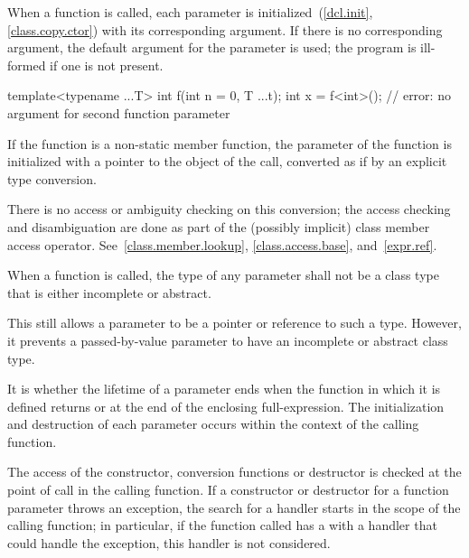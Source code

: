 \pnum
{}%
%
%
When a function is called, each parameter is
initialized~(\ref{dcl.init}, \ref{class.copy.ctor}) with
its corresponding argument.
If there is no corresponding argument,
the default argument for the parameter is used;
the program is ill-formed if one is not present.
\begin{example}
\begin{codeblock}
template<typename ...T> int f(int n = 0, T ...t);
int x = f<int>();               // error: no argument for second function parameter
\end{codeblock}
\end{example}
If the function is a non-static member
function, the  parameter of the function
is initialized with a pointer to the object of the call, converted
as if by an explicit type conversion.
\begin{note}
There is no access or ambiguity checking on this conversion; the access
checking and disambiguation are done as part of the (possibly implicit)
class member access operator.
See~\ref{class.member.lookup}, \ref{class.access.base},
and~\ref{expr.ref}.
\end{note}
When a function is called, the type of any parameter
shall not be a class type that is either incomplete or abstract.
\begin{note}
This still allows a parameter to be a pointer or reference to such
a type. However, it prevents a passed-by-value parameter
to have an incomplete or abstract class type.
\end{note}
It is  whether the
lifetime of a parameter ends when the function in which it is defined
returns or at the end of the enclosing full-expression.
The initialization and destruction of each parameter occurs
within the context of the calling function.
\begin{example}
The access of the constructor, conversion functions or destructor is
checked at the point of call in the calling function. If a constructor
or destructor for a function parameter throws an exception, the search
for a handler starts in the scope of the calling function; in
particular, if the function called has a 
with a handler that could handle the exception,
this handler is not considered.
\end{example}

